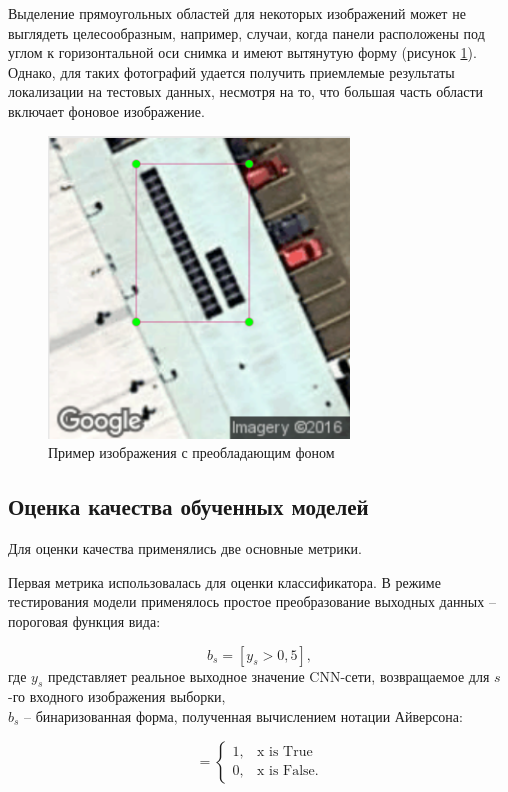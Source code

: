 Выделение прямоугольных областей для некоторых изображений может не выглядеть целесообразным, например, случаи, когда панели расположены под углом к горизонтальной оси снимка и имеют вытянутую форму (рисунок \ref{fig:background_dominate}). Однако, для таких фотографий удается получить приемлемые результаты локализации на тестовых данных, несмотря на то, что большая часть области включает фоновое изображение.
 
\begin{figure}[ht]
	\centering
	\includegraphics[width=8cm]{man-source/images/ch4/pic4-18.png}
	\caption{Пример изображения с преобладающим фоном}
	\label{fig:background_dominate}
\end{figure}

\subsection{Оценка качества обученных моделей}

Для оценки качества применялись две основные метрики. 

Первая метрика использовалась для оценки классификатора. В режиме тестирования модели применялось простое преобразование выходных данных -- пороговая функция вида:

\begin{equation*}
    b_s = [y_s > 0,5],
\end{equation*}
где $y_s$ представляет реальное выходное значение CNN-сети, возвращаемое для $s$-го входного изображения выборки,\\
$b_s$ -- бинаризованная форма, полученная вычислением нотации Айверсона:

\begin{equation*}
    [x] = 
    \begin{cases}
        1, & \text{x is True} \\
        0, & \text{x is False}.
    \end{cases}
\end{equation*}

